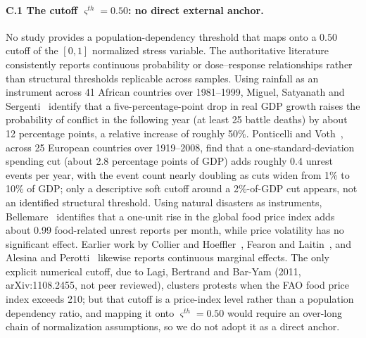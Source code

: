 \documentclass[12pt]{article}
\theoremstyle{plain}
\begin{document}
\paragraph{C.1 The cutoff $\varsigma^{th}=0.50$: no direct external anchor.}
No study provides a population-dependency threshold that maps onto a $0.50$
cutoff of the $[0,1]$ normalized stress variable. The authoritative literature
consistently reports continuous probability or dose--response relationships
rather than structural thresholds replicable across samples. Using rainfall as
an instrument across 41 African countries over 1981--1999, Miguel, Satyanath
and Sergenti~\cite{MSS2004} identify that a five-percentage-point drop in real
GDP growth raises the probability of conflict in the following year (at least
25 battle deaths) by about 12 percentage points, a relative increase of
roughly 50\%. Ponticelli and Voth~\cite{PV2020}, across 25 European countries
over 1919--2008, find that a one-standard-deviation spending cut (about 2.8
percentage points of GDP) adds roughly 0.4 unrest events per year, with the
event count nearly doubling as cuts widen from 1\% to 10\% of GDP; only a
descriptive soft cutoff around a 2\%-of-GDP cut appears, not an identified
structural threshold. Using natural disasters as instruments,
Bellemare~\cite{Bellemare2015} identifies that a one-unit rise in the global
food price index adds about 0.99 food-related unrest reports per month, while
price volatility has no significant effect. Earlier work by Collier and
Hoeffler~\cite{CH2004}, Fearon and Laitin~\cite{FL2003}, and Alesina and
Perotti~\cite{AP1996} likewise reports continuous marginal effects. The only
explicit numerical cutoff, due to Lagi, Bertrand and Bar-Yam (2011,
arXiv:1108.2455, not peer reviewed), clusters protests when the FAO food price
index exceeds 210; but that cutoff is a price-index level rather than a
population dependency ratio, and mapping it onto $\varsigma^{th}=0.50$ would
require an over-long chain of normalization assumptions, so we do not adopt it
as a direct anchor.
\end{document}
